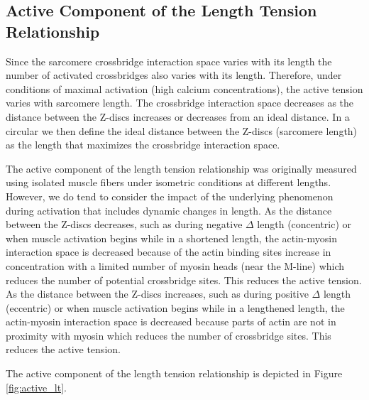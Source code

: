 \subsection{Active Component of the Length Tension Relationship}
Since the sarcomere crossbridge interaction space varies with its length \footnotemark{} the number of activated crossbridges also varies with its length. Therefore, under conditions of maximal activation (high calcium concentrations), the active tension varies with sarcomere length.  The crossbridge interaction space decreases as the distance between the Z-discs increases or decreases from an ideal distance. In a circular we then define the ideal distance between the Z-discs (sarcomere length) as the length that maximizes the crossbridge interaction space. 

The active component of the length tension relationship was originally measured using isolated muscle fibers under isometric conditions at different lengths. However, we do tend to consider the impact of the underlying phenomenon during activation that includes dynamic changes in length. As the distance between the Z-discs decreases, such as during negative $\Delta$ length (concentric) or when muscle activation begins while in a shortened length, the actin-myosin interaction space is decreased because of the actin binding sites increase in concentration with a limited number of myosin heads (near the M-line) which reduces the number of potential crossbridge sites. This reduces the active tension. As the distance between the Z-discs increases, such as during positive $\Delta$ length (eccentric) or when muscle activation begins while in a lengthened length, the actin-myosin interaction space is decreased because parts of actin are not in proximity with myosin which reduces the number of crossbridge sites. This reduces the active tension.

The active component of the length tension relationship is depicted in Figure \ref{fig:active_lt}.\footnotemark{}

